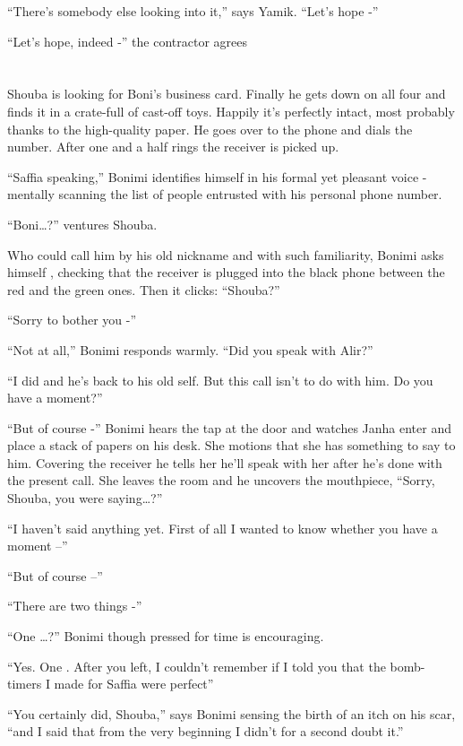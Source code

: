 \documentclass[twoside,11pt]{book}
\begin{document}
``There's somebody else looking into it,'' says Yamik. ``Let's hope
-''

``Let's hope, indeed -'' the contractor agrees


\bigskip

\chapter{}

Shouba is looking for Boni's business card. Finally he gets down on all four and finds it in a crate-full of cast-off
toys. Happily it's perfectly intact, most probably thanks to the high-quality paper. He goes over to the phone and
dials the number. After one and a half rings the receiver is picked up.

``Saffia speaking,'' Bonimi identifies himself in his formal yet pleasant voice - mentally
scanning the list of people entrusted with his personal phone number.

``Boni{\dots}?'' ventures Shouba.

Who could call him by his old nickname and with such familiarity, Bonimi asks himself , checking that the receiver is
plugged into the black phone between the red and the green ones. Then it clicks: ``Shouba?''

``Sorry to bother you -''

``Not at all,'' Bonimi responds warmly. ``Did you speak with Alir?''

``I did and he's back to his old self. But this call isn't to do with him. Do you have a
moment?''

``But of course -'' Bonimi hears the tap at the door and watches Janha enter and place a stack
of papers on his desk. She motions that she has something to say to him. Covering the receiver he tells her he'll speak
with her after he's done with the present call. She leaves the room and he uncovers the mouthpiece,
``Sorry, Shouba, you were saying{\dots}?''

``I haven't said anything yet. First of all I wanted to know whether you have a moment --''

``But of course --''

``There are two things -''

``One {\dots}?'' Bonimi though pressed for time is encouraging.

``Yes. One . After you left, I couldn't remember if I told you that the bomb-timers I made for Saffia
were perfect''

``You certainly did, Shouba,'' says Bonimi sensing the birth of an itch on his scar,
``and I said that from the very beginning I didn't for a second doubt it.''
\end{document}
